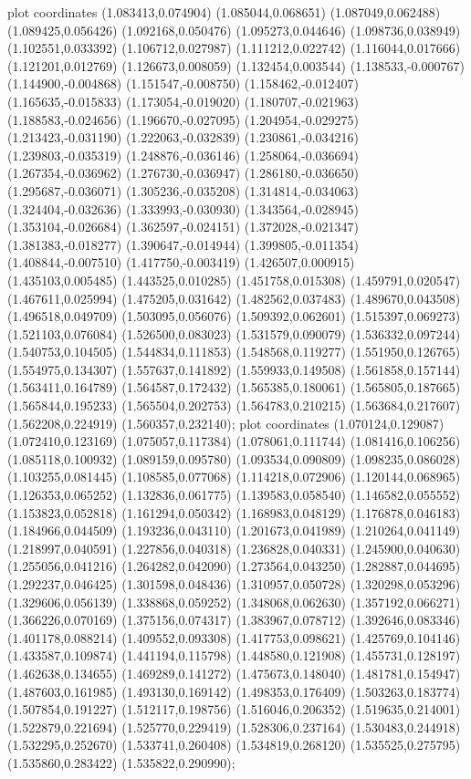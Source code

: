 { plot coordinates {(1.083413,0.074904) (1.085044,0.068651) (1.087049,0.062488) (1.089425,0.056426) (1.092168,0.050476) (1.095273,0.044646) (1.098736,0.038949) (1.102551,0.033392) (1.106712,0.027987) (1.111212,0.022742) (1.116044,0.017666) (1.121201,0.012769) (1.126673,0.008059) (1.132454,0.003544) (1.138533,-0.000767) (1.144900,-0.004868) (1.151547,-0.008750) (1.158462,-0.012407) (1.165635,-0.015833) (1.173054,-0.019020) (1.180707,-0.021963) (1.188583,-0.024656) (1.196670,-0.027095) (1.204954,-0.029275) (1.213423,-0.031190) (1.222063,-0.032839) (1.230861,-0.034216) (1.239803,-0.035319) (1.248876,-0.036146) (1.258064,-0.036694) (1.267354,-0.036962) (1.276730,-0.036947) (1.286180,-0.036650) (1.295687,-0.036071) (1.305236,-0.035208) (1.314814,-0.034063) (1.324404,-0.032636) (1.333993,-0.030930) (1.343564,-0.028945) (1.353104,-0.026684) (1.362597,-0.024151) (1.372028,-0.021347) (1.381383,-0.018277) (1.390647,-0.014944) (1.399805,-0.011354) (1.408844,-0.007510) (1.417750,-0.003419) (1.426507,0.000915) (1.435103,0.005485) (1.443525,0.010285) (1.451758,0.015308) (1.459791,0.020547) (1.467611,0.025994) (1.475205,0.031642) (1.482562,0.037483) (1.489670,0.043508) (1.496518,0.049709) (1.503095,0.056076) (1.509392,0.062601) (1.515397,0.069273) (1.521103,0.076084) (1.526500,0.083023) (1.531579,0.090079) (1.536332,0.097244) (1.540753,0.104505) (1.544834,0.111853) (1.548568,0.119277) (1.551950,0.126765) (1.554975,0.134307) (1.557637,0.141892) (1.559933,0.149508) (1.561858,0.157144) (1.563411,0.164789) (1.564587,0.172432) (1.565385,0.180061) (1.565805,0.187665) (1.565844,0.195233) (1.565504,0.202753) (1.564783,0.210215) (1.563684,0.217607) (1.562208,0.224919) (1.560357,0.232140)};
 plot coordinates {(1.070124,0.129087) (1.072410,0.123169) (1.075057,0.117384) (1.078061,0.111744) (1.081416,0.106256) (1.085118,0.100932) (1.089159,0.095780) (1.093534,0.090809) (1.098235,0.086028) (1.103255,0.081445) (1.108585,0.077068) (1.114218,0.072906) (1.120144,0.068965) (1.126353,0.065252) (1.132836,0.061775) (1.139583,0.058540) (1.146582,0.055552) (1.153823,0.052818) (1.161294,0.050342) (1.168983,0.048129) (1.176878,0.046183) (1.184966,0.044509) (1.193236,0.043110) (1.201673,0.041989) (1.210264,0.041149) (1.218997,0.040591) (1.227856,0.040318) (1.236828,0.040331) (1.245900,0.040630) (1.255056,0.041216) (1.264282,0.042090) (1.273564,0.043250) (1.282887,0.044695) (1.292237,0.046425) (1.301598,0.048436) (1.310957,0.050728) (1.320298,0.053296) (1.329606,0.056139) (1.338868,0.059252) (1.348068,0.062630) (1.357192,0.066271) (1.366226,0.070169) (1.375156,0.074317) (1.383967,0.078712) (1.392646,0.083346) (1.401178,0.088214) (1.409552,0.093308) (1.417753,0.098621) (1.425769,0.104146) (1.433587,0.109874) (1.441194,0.115798) (1.448580,0.121908) (1.455731,0.128197) (1.462638,0.134655) (1.469289,0.141272) (1.475673,0.148040) (1.481781,0.154947) (1.487603,0.161985) (1.493130,0.169142) (1.498353,0.176409) (1.503263,0.183774) (1.507854,0.191227) (1.512117,0.198756) (1.516046,0.206352) (1.519635,0.214001) (1.522879,0.221694) (1.525770,0.229419) (1.528306,0.237164) (1.530483,0.244918) (1.532295,0.252670) (1.533741,0.260408) (1.534819,0.268120) (1.535525,0.275795) (1.535860,0.283422) (1.535822,0.290990)};
}
